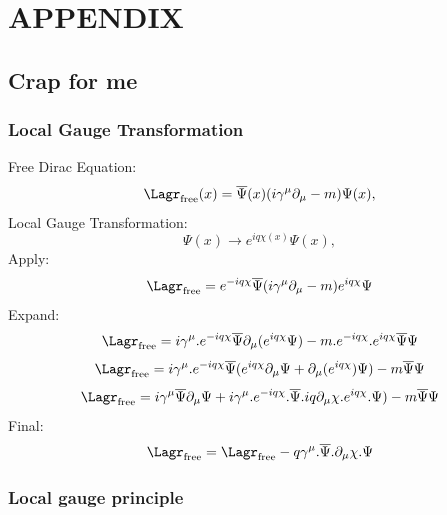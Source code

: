 \chapter{APPENDIX}
\section{Crap for me}

\subsection{Local Gauge Transformation}
Free Dirac Equation:
\begin{equation*}
\Lagr_{\text{free}}(x) = \overline{\Psi}(x)(i\gamma^{\mu}\partial_{\mu}-m)\Psi(x),
\end{equation*}
Local Gauge Transformation:
\begin{equation*}
\Psi(x) \to e^{iq\chi(x)}\Psi(x),
\end{equation*}
Apply:
\begin{equation*}
\Lagr_{\text{free}} = e^{-iq\chi}\overline{\Psi}(i\gamma^{\mu}\partial_{\mu}-m)e^{iq\chi}\Psi
\end{equation*}
Expand:
\begin{equation*}
\Lagr_{\text{free}} = i\gamma^{\mu}.e^{-iq\chi}\overline{\Psi}\partial_{\mu}(e^{iq\chi}\Psi)-m.e^{-iq\chi}.e^{iq\chi}\overline{\Psi}\Psi
\end{equation*}
\begin{equation*}
\Lagr_{\text{free}} = i\gamma^{\mu}.e^{-iq\chi}\overline{\Psi}(e^{iq\chi}\partial_{\mu}\Psi+\partial_{\mu}(e^{iq\chi})\Psi)-m\overline{\Psi}\Psi
\end{equation*}
\begin{equation*}
\Lagr_{\text{free}} = i\gamma^{\mu}\overline{\Psi}\partial_{\mu}\Psi+i\gamma^{\mu}.e^{-iq\chi}.\overline{\Psi}.iq\partial_{\mu}\chi.e^{iq\chi}.\Psi)-m\overline{\Psi}\Psi
\end{equation*}
Final:
\begin{equation*}
\Lagr_{\text{free}} = \Lagr_{\text{free}}-q\gamma^{\mu}.\overline{\Psi}.\partial_{\mu}\chi.\Psi
\end{equation*}

\subsection{Local gauge principle} %
\label{sub:local_gauge_principle}

